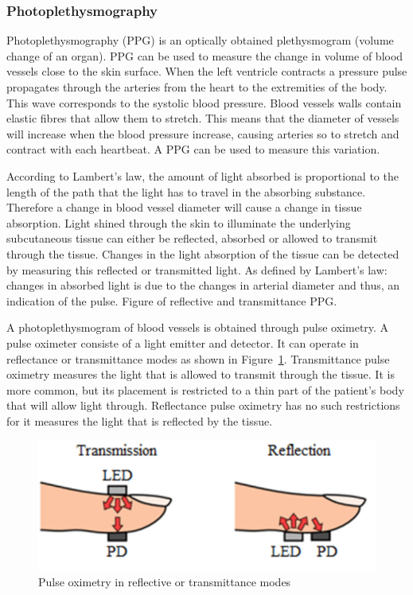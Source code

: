 \subsubsection{Photoplethysmography}
Photoplethysmography (PPG) is an optically obtained  plethysmogram (volume change of an organ). PPG can be used to measure the change in volume of blood vessels close to the skin surface. When the left ventricle contracts a pressure pulse propagates through the arteries from the heart to the extremities of the body. This wave corresponds to the systolic blood pressure. Blood vessels walls contain elastic fibres that allow them to stretch. This means that the diameter of vessels will increase when the blood pressure increase, causing   arteries so to stretch and contract with each heartbeat. A PPG can be used to measure this variation.

According to Lambert's law, the amount of light absorbed is proportional to the length of the path that the light has to travel in the absorbing substance. Therefore a change in blood vessel diameter will cause a change in tissue absorption. Light shined through the skin to illuminate the underlying subcutaneous tissue can either be reflected, absorbed or allowed to transmit through the tissue. Changes in the light absorption of the tissue can be detected by measuring this reflected or transmitted light. As defined by Lambert's law: changes in absorbed light is due to the changes in arterial diameter and thus, an indication of the pulse. Figure of reflective and transmittance PPG.

A photoplethysmogram of blood vessels is obtained through pulse oximetry. A pulse oximeter consiste of a light emitter and detector. It can operate in reflectance or transmittance modes as shown in Figure~\ref{fig:PulseOxiModes}. Transmittance pulse oximetry measures the light that is allowed to transmit through the tissue. It is more common, but its placement is restricted to a thin part of the patient's body that will allow light through. Reflectance pulse oximetry has no such restrictions for it measures the light that is reflected by the tissue.

\begin{figure}
   \centering
   \includegraphics[scale=1]{figs/PulseOxiModes}
   \caption{Pulse oximetry in reflective or transmittance modes}
   \label{fig:PulseOxiModes}
\end{figure}

